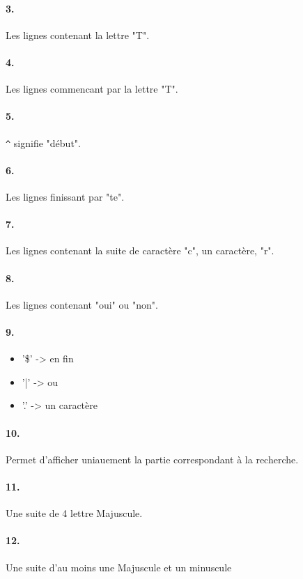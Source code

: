 \paragraph{3.}
Les lignes contenant la lettre "T".

\paragraph{4.}
Les lignes commencant par la lettre "T".

\paragraph{5.}
\texttt{\^} signifie "début".

\paragraph{6.}
Les lignes finissant par "te".

\paragraph{7.}
Les lignes contenant la suite de caractère "c", un caractère, "r".

\paragraph{8.}
Les lignes contenant "oui" ou "non".

\paragraph{9.}
\begin{itemize}
\item '\$' -> en fin
\item '|' -> ou
\item '.' -> un caractère
\end{itemize}

\paragraph{10.}
Permet d'afficher uniauement la partie correspondant à la recherche.

\paragraph{11.}
Une suite de 4 lettre Majuscule.

\paragraph{12.}
Une suite d'au moins une Majuscule et un minuscule

